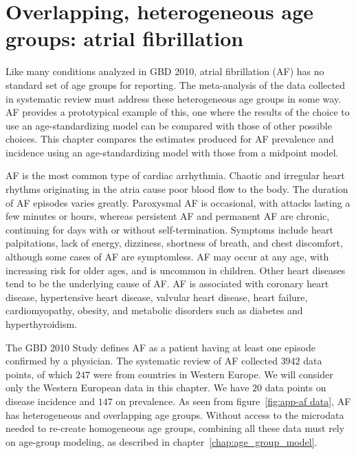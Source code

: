 \chapter{Overlapping, heterogeneous age groups: atrial fibrillation}
\label{applications-age_groups}

Like many conditions analyzed in GBD 2010, atrial
fibrillation (AF) has no standard set of age groups for reporting.  The
meta-analysis of the data collected in systematic review must address
these heterogeneous age groups in some way. AF provides a prototypical
example of this, one where the results of the choice to
use an age-standardizing model can be compared with those of other possible
choices.  This chapter compares the estimates produced for AF
prevalence and incidence using an age-standardizing model with those
from a midpoint model.

AF is the most common type of cardiac arrhythmia.  Chaotic and
irregular heart rhythms originating in the atria cause poor blood flow
to the body.  The duration of AF episodes varies greatly.
Paroxysmal AF is occasional, with attacks lasting a few minutes or hours,
whereas persistent AF and permanent AF are chronic, continuing for
days with or without self-termination.  Symptoms include
heart palpitations, lack of energy, dizziness, shortness of breath, and
chest discomfort, although some cases of AF are
symptomless.  AF may occur at any age, with increasing risk for older
ages, and is uncommon in children.  Other heart diseases tend to be
the underlying cause of AF.  AF is associated with coronary heart
disease, hypertensive heart disease, valvular heart disease, heart
failure, cardiomyopathy, obesity, and metabolic disorders such as
diabetes and hyperthyroidism. \cite{rich_epidemiology_2009,
  rho_asymptomatic_2005, fuster_acc/aha/esc_2006, radford_atrial_1977}

The GBD 2010 Study defines AF as a patient having at least one episode
confirmed by a physician.  The systematic review of AF collected $3942$
data points, of which $247$ were from countries in Western Europe.  We
will consider only the Western European data in this chapter.
We have $20$ data points on disease incidence and $147$ on prevalence.
As seen from figure~\ref{fig:app-af data}, AF has
heterogeneous and overlapping age groups.  Without access to the
microdata needed to re-create homogeneous age groups, combining all
these data must rely on age-group modeling, as described in
chapter~\ref{chap:age_group_model}.

